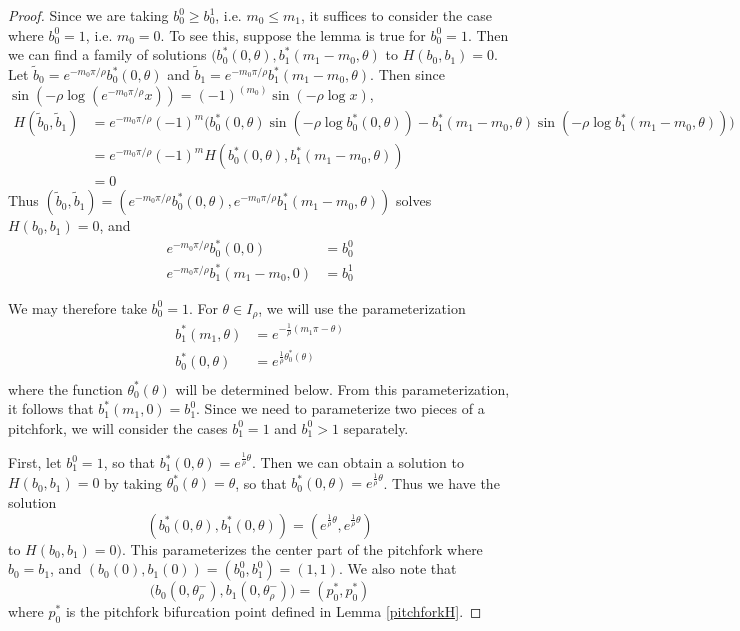 \documentclass[thesis.tex]{subfiles}
\begin{document}
\begin{lemma}
\begin{proof}
Since we are taking $b_0^0 \geq b_0^1$, i.e. $m_0 \leq m_1$, it suffices to consider the case where $b_0^0 = 1$, i.e. $m_0 = 0$. To see this, suppose the lemma is true for $b_0^0 = 1$. Then we can find a family of solutions $(b_0^*(0, \theta), b_1^*(m_1 - m_0, \theta)$ to $H(b_0, b_1) = 0$. Let $\tilde{b}_0 = e^{-m_0 \pi/\rho} b_0^*(0, \theta)$ and $\tilde{b}_1 = e^{-m_0 \pi/\rho} b_1^*(m_1 - m_0, \theta)$. Then since $\sin \left( -\rho \log ( e^{-m_0 \pi/\rho} x )\right) = (-1)^(m_0) \sin(-\rho \log x)$, 
\begin{align*}
H(\tilde{b}_0, \tilde{b}_1) 
&= e^{-m_0 \pi/\rho} (-1)^m \Big( b_0^*(0, \theta) \sin (-\rho \log b_0^*(0, \theta)) - b_1^*(m_1 - m_0, \theta) \sin (-\rho \log b_1^*(m_1 - m_0, \theta))\Big) \\
&= e^{-m_0 \pi/\rho} (-1)^m H( b_0^*(0, \theta), b_1^*(m_1 - m_0, \theta)) \\
&= 0
\end{align*}
Thus $(\tilde{b}_0, \tilde{b}_1) = (e^{-m_0 \pi/\rho} b_0^*(0, \theta), e^{-m_0 \pi/\rho} b_1^*(m_1 - m_0, \theta))$ solves $H(b_0, b_1) = 0$, and 
\begin{align*}
e^{-m_0 \pi/\rho} b_0^*(0, 0) &= b_0^0 \\
e^{-m_0 \pi/\rho} b_1^*(m_1 - m_0, 0) &= b_0^1
\end{align*}

We may therefore take $b_0^0 = 1$. For $\theta \in I_\rho$, we will use the parameterization
\begin{equation}\label{thetaparam1}
\begin{aligned}
b_1^*(m_1, \theta) &= e^{ -\frac{1}{\rho}(m_1 \pi - \theta) } \\
b_0^*(0, \theta) &= e^{ \frac{1}{\rho} \theta_0^*(\theta) } \\
\end{aligned}
\end{equation}
where the function $\theta_0^*(\theta)$ will be determined below. From this parameterization, it follows that $b_1^*(m_1, 0) = b_1^0$. Since we need to parameterize two pieces of a pitchfork, we will consider the cases $b_1^0 = 1$ and $b_1^0 > 1$ separately.

First, let $b_1^0 = 1$, so that $b_1^*(0, \theta) = e^{ \frac{1}{\rho}\theta}$. Then we can obtain a solution to $H(b_0, b_1) = 0$ by taking $\theta_0^*(\theta) = \theta$, so that $b_0^*(0, \theta) = e^{ \frac{1}{\rho}\theta}$. Thus we have the solution
\[
( b_0^*(0, \theta), b_1^*(0, \theta) ) = ( e^{ \frac{1}{\rho}\theta }, e^{ \frac{1}{\rho}\theta })
\]
to $H(b_0, b_1) = 0)$. This parameterizes the center part of the pitchfork where $b_0 = b_1$, and $(b_0(0), b_1(0)) = (b_0^0, b_1^0) = (1,1)$. We also note that
\[
\Big(b_0(0, \theta_\rho^-), b_1(0, \theta_\rho^-)\Big) = (p_0^*, p_0^*)
\]
where $p_0^*$ is the pitchfork bifurcation point defined in Lemma \ref{pitchforkH}.


\end{proof}
\end{lemma}
\end{document}
